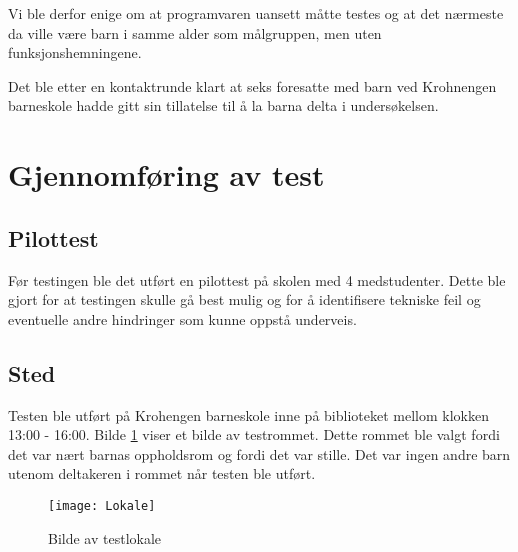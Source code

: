 Vi ble derfor enige om at programvaren uansett måtte testes og at det nærmeste da ville være barn i samme alder som målgruppen, men uten funksjonshemningene. 

Det ble etter en kontaktrunde klart at seks foresatte med barn ved Krohnengen barneskole hadde gitt sin tillatelse til å la barna delta i undersøkelsen. 
 
 
\section{Gjennomføring av test} 
 
 
\subsection{Pilottest} 
 
 
Før testingen ble det utført en pilottest på skolen med 4 medstudenter. Dette ble gjort for at testingen skulle gå best mulig og for å identifisere tekniske feil og eventuelle andre hindringer som kunne oppstå underveis.  
 
 
\subsection{Sted} 
Testen ble utført på Krohengen barneskole inne på biblioteket mellom klokken 13:00 - 
16:00. Bilde \ref{fig:test_lokale} viser et bilde av testrommet. Dette rommet ble valgt fordi det var nært barnas oppholdsrom og fordi det var 
stille. Det var ingen andre barn utenom deltakeren i rommet når testen ble utført. 

 
 
\begin{figure}[ht!] 
\centering 
\texttt{[image: Lokale]} 
\caption{Bilde av testlokale} 
\label{fig:test_lokale} 
\end{figure} 
 
 
 
 
